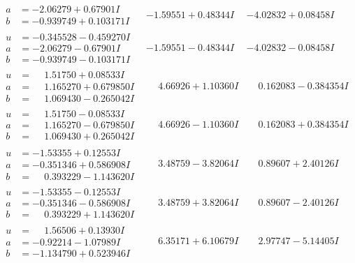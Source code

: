 \documentclass[1p]{elsarticle_modified}
\theoremstyle{definition}
\begin{document}
$$\begin{array}{c|c|c}
\begin{aligned}
a &= -2.06279 + 0.67901 I \\
b &= -0.939749 + 0.103171 I\end{aligned}
 & -1.59551 + 0.48344 I & -4.02832 + 0.08458 I \\ \hline\begin{aligned}
u &= -0.345528 - 0.459270 I \\
a &= -2.06279 - 0.67901 I \\
b &= -0.939749 - 0.103171 I\end{aligned}
 & -1.59551 - 0.48344 I & -4.02832 - 0.08458 I \\ \hline\begin{aligned}
u &= \phantom{-}1.51750 + 0.08533 I \\
a &= \phantom{-}1.165270 + 0.679850 I \\
b &= \phantom{-}1.069430 - 0.265042 I\end{aligned}
 & \phantom{-}4.66926 + 1.10360 I & \phantom{-}0.162083 - 0.384354 I \\ \hline\begin{aligned}
u &= \phantom{-}1.51750 - 0.08533 I \\
a &= \phantom{-}1.165270 - 0.679850 I \\
b &= \phantom{-}1.069430 + 0.265042 I\end{aligned}
 & \phantom{-}4.66926 - 1.10360 I & \phantom{-}0.162083 + 0.384354 I \\ \hline\begin{aligned}
u &= -1.53355 + 0.12553 I \\
a &= -0.351346 + 0.586908 I \\
b &= \phantom{-}0.393229 - 1.143620 I\end{aligned}
 & \phantom{-}3.48759 - 3.82064 I & \phantom{-}0.89607 + 2.40126 I \\ \hline\begin{aligned}
u &= -1.53355 - 0.12553 I \\
a &= -0.351346 - 0.586908 I \\
b &= \phantom{-}0.393229 + 1.143620 I\end{aligned}
 & \phantom{-}3.48759 + 3.82064 I & \phantom{-}0.89607 - 2.40126 I \\ \hline\begin{aligned}
u &= \phantom{-}1.56506 + 0.13930 I \\
a &= -0.92214 - 1.07989 I \\
b &= -1.134790 + 0.523946 I\end{aligned}
 & \phantom{-}6.35171 + 6.10679 I & \phantom{-}2.97747 - 5.14405 I \\ \hline\begin{aligned}

\end{aligned}
\end{array}$$
\end{document}
